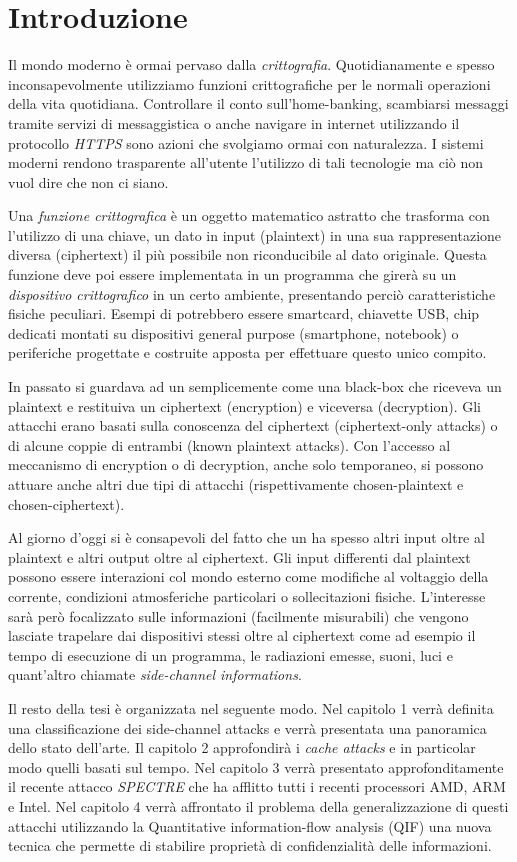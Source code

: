 \chapter{Introduzione}
	Il mondo moderno è ormai pervaso dalla \emph{crittografia}. Quotidianamente e spesso inconsapevolmente utilizziamo funzioni crittografiche per le normali operazioni della vita quotidiana. Controllare il conto sull'home-banking, scambiarsi messaggi tramite servizi di messaggistica o anche navigare in internet utilizzando il protocollo \emph{HTTPS} sono azioni che svolgiamo ormai con naturalezza. I sistemi moderni rendono trasparente all'utente l'utilizzo di tali tecnologie ma ciò non vuol dire che non ci siano.
	
	Una \emph{funzione crittografica} è un oggetto matematico astratto che trasforma con l'utilizzo di una chiave, un dato in input (plaintext) in una sua rappresentazione diversa (ciphertext) il più possibile non riconducibile al dato originale. Questa funzione deve poi essere implementata in un programma che girerà su un \emph{dispositivo crittografico} in un certo ambiente, presentando perciò caratteristiche fisiche peculiari. Esempi di \dispp potrebbero essere smartcard, chiavette USB, chip dedicati montati su dispositivi general purpose (smartphone, notebook) o periferiche progettate e costruite apposta per effettuare questo unico compito.
	
	In passato si guardava ad un \disps semplicemente come una black-box che riceveva un plaintext e restituiva un ciphertext (encryption) e viceversa (decryption). Gli attacchi erano basati sulla conoscenza del ciphertext (ciphertext-only attacks) o di alcune coppie di entrambi (known plaintext attacks). Con l'accesso al meccanismo di encryption o di decryption, anche solo temporaneo, si possono attuare anche altri due tipi di attacchi (rispettivamente chosen-plaintext e chosen-ciphertext)\cite{dispenseCS}.
	
	Al giorno d'oggi si è consapevoli del fatto che un \disps ha spesso altri input oltre al plaintext e altri output oltre al ciphertext. Gli input differenti dal plaintext possono essere interazioni col mondo esterno come modifiche al voltaggio della corrente, condizioni atmosferiche particolari o sollecitazioni fisiche. L'interesse sarà però focalizzato sulle informazioni (facilmente misurabili) che vengono lasciate trapelare dai dispositivi stessi oltre al ciphertext come ad esempio il tempo di esecuzione di un programma, le radiazioni emesse, suoni, luci e quant'altro chiamate \emph{side-channel informations}.
	 
	 Il resto della tesi è organizzata nel seguente modo. Nel capitolo 1 verrà definita una classificazione dei side-channel attacks e verrà presentata una panoramica dello stato dell'arte. Il capitolo 2 approfondirà i \emph{cache attacks} e in particolar modo quelli basati sul tempo.
	 Nel capitolo 3 verrà presentato approfonditamente il recente attacco \emph{SPECTRE} che ha afflitto tutti i recenti processori AMD, ARM e Intel.
	 Nel capitolo 4 verrà affrontato il problema della generalizzazione di questi attacchi utilizzando la Quantitative information-flow analysis (QIF) una nuova tecnica che permette di stabilire proprietà di confidenzialità delle informazioni.
